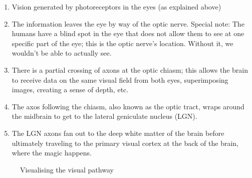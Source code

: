 \begin{enumerate}
	\item Vision generated by photoreceptors in the eyes (as explained above)
	\item The information leaves the eye by way of the optic nerve. Special note: The humans have a blind spot in the eye that does not allow them to see at one specific part of the eye; this is the optic nerve's location. Without it, we wouldn't be able to actually see.
	\item There is a partial crossing of axons at the optic chiasm; this allows the brain to receive data on the same visual field from both eyes, superimposing images, creating a sense of depth, etc.
	\item The axos following the chiasm, also known as the optic tract, wraps around the midbrain to get to the lateral geniculate nucleus (LGN).
	\item The LGN axons fan out to the deep white matter of the brain before ultimately traveling to the primary visual cortex at the back of the brain, where the magic happens.
\end{enumerate}
\begin{figure}[!htb]
	\caption{\label{fig:lens} Visualising the visual pathway}
\end{figure}
